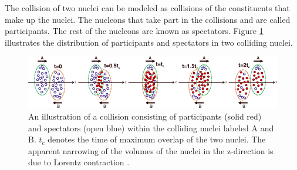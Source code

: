 The collision of two nuclei can be modeled as collisions of the constituents that make up the nuclei. The nucleons that take part in the collisions and are called participants. The rest of the nucleons are known as spectators. Figure \ref{fig:part_spec} illustrates the distribution of participants and spectators in two colliding nuclei.%
\begin{figure}[h]
  \centering
  \includegraphics[width=6.5in]{figures/part_spec_Vovchenko.png}
  \caption{An illustration of a collision consisting of participants (solid red) and spectators (open blue) within the colliding nuclei labeled A and B. $t_{c}$ denotes the time of maximum overlap of the two nuclei. The apparent narrowing of the volumes of the nuclei in the z-direction is due to Lorentz contraction \cite{PhysRevC.90.044907}.}\label{fig:part_spec}
\end{figure}

